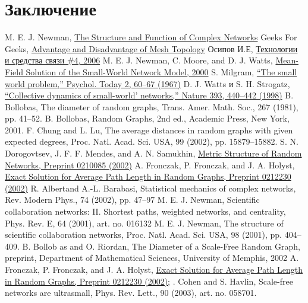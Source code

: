 \documentclass[a4paper]{article}
\begin{document}
\section{Заключение}

\begin{thebibliography}{}
     M. E. J. Newman,  \href{https://github.com/julproh/Thesis}{The Structure and Function of Complex Networks}
     Geeks For Geeks,  \href{https://www.geeksforgeeks.org/advantage-and-disadvantage-of-mesh-topology/}{Advantage and Disadvantage of Mesh Topology}
     Осипов И.Е,  \href{http://lib.tssonline.ru/articles2/fix-op/mesh_seti_techn_prilozh_oborud}{Технологии и средства связи \#4, 2006}
     M. E. J. Newman, C. Moore, and D. J. Watts,  \href{https://journals.aps.org/prl/abstract/10.1103/PhysRevLett.84.3201}{Mean-Field Solution of the Small-World Network Model, 2000}
     S. Milgram, \href{http://snap.stanford.edu/class/cs224w-readings/milgram67smallworld.pdf}{“The small world problem,” Psychol. Today 2, 60–67 (1967)} 
     D. J. Watts и S. H. Strogatz, \href{https://www.nature.com/articles/30918}{“Collective dynamics of small-world’ networks,” Nature 393, 440–442 (1998)}
     B. Bollobas, The diameter of random graphs, Trans. Amer. Math. Soc., 267 (1981), pp. 41–52.
     B. Bollobas, Random Graphs, 2nd ed., Academic Press, New York, 2001.
     F. Chung and L. Lu, The average distances in random graphs with given expected degrees, Proc. Natl. Acad. Sci. USA, 99 (2002), pp. 15879–15882.
     S. N. Dorogovtsev, J. F. F. Mendes, and A. N. Samukhin, \href{http://arxiv.org/abs/cond-mat/}{ Metric Structure of Random Networks, Preprint 0210085 (2002)}
     A. Fronczak, P. Fronczak, and J. A. Holyst, \href{http://arxiv.org/abs/cond-mat/}{Exact Solution for Average Path Length in Random Graphs, Preprint 0212230 (2002)} 
     R. Albertand A.-L. Barabasi, Statistical mechanics of complex networks, Rev. Modern
    Phys., 74 (2002), pp. 47–97
     M. E. J. Newman, Scientific collaboration networks: II. Shortest paths, weighted networks,
    and centrality, Phys. Rev. E, 64 (2001), art. no. 016132
     M. E. J. Newman, The structure of scientific collaboration networks, Proc. Natl. Acad. Sci.
    USA, 98 (2001), pp. 404–409.
     B. Bollob as and O. Riordan, The Diameter of a Scale-Free Random Graph, preprint,
    Department of Mathematical Sciences, University of Memphis, 2002
     A. Fronczak, P. Fronczak, and J. A. Holyst, \href{http://arxiv.org/abs/cond-mat/}{Exact Solution for Average Path Length
    in Random Graphs, Preprint 0212230 (2002);}
     . Cohen and S. Havlin, Scale-free networks are ultrasmall, Phys. Rev. Lett., 90 (2003), art. no. 058701.
\end{thebibliography}
\end{document}
